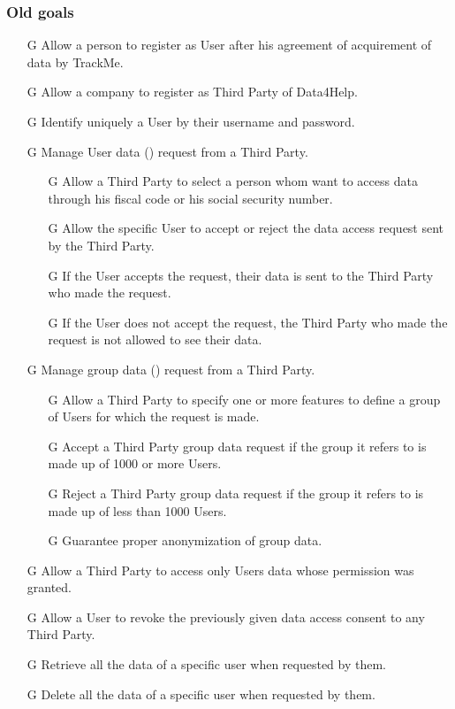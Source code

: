 \documentclass[../../rasd.tex]{subfiles}
\begin{document}
					\subsubsection{Old goals}
					\begin{itemize}
						\item[G\subs{1}]Allow a person to register as User after his agreement of acquirement of data by TrackMe.
						\item[G\subs{2}]Allow a company to register as Third Party of Data4Help.
						\item[G\subs{3}]Identify uniquely a User by their username and password.

						\item[G\subs{4}]Manage User data () request from a Third Party.
							\begin{itemize}
								\item [G\subs{4.1}]Allow a Third Party to select a person whom want to access data through his fiscal code or his social security number.
								\item [G\subs{4.2}]Allow the specific User to accept or reject the data access request sent by the Third Party.
								\item [G\subs{4.3}]If the User accepts the request, their data is sent to the Third Party who made the request.
								\item [G\subs{4.4}]If the User does not accept the request, the Third Party who made the request is not allowed to see their data.
							\end{itemize}

						\item [G\subs{5}]Manage group data () request from a Third Party.
							\begin{itemize}
								\item [G\subs{5.1}]Allow a Third Party to specify one or more features to define a group of Users for which the request is made.
								\item [G\subs{5.2}]Accept a Third Party group data request if the group it refers to is made up of 1000 or more Users.
								\item [G\subs{5.3}]Reject a Third Party group data request if the group it refers to is made up of less than 1000 Users.
								\item [G\subs{5.4}]Guarantee proper anonymization of group data.
							\end{itemize}		
						\item[G\subs{7}]Allow a Third Party to access only Users data whose permission was granted.

						\item[G\subs{8}]Allow a User to revoke the previously given data access consent to any Third Party.
						\item[G\subs{9}]Retrieve all the data of a specific user when requested by them.
						\item[G\subs{10}]Delete all the data of a specific user when requested by them.


					\end{itemize}
\end{document}
